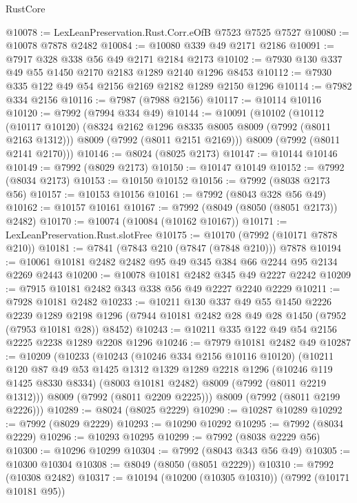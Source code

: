 \begin{lexlean}{RustCore}
\begin{coremodule}
@10078 := LexLeanPreservation.Rust.Corr.eOfB @7523 @7525 @7527
@10080 := @10078 @7878 @2482
@10084 := @10080 @339 @49 @2171 @2186
@10091 := @7917 @328 @338 @56 @49 @2171 @2184 @2173
@10102 := @7930 @130 @337 @49 @55 @1450 @2170 @2183 @1289 @2140 @1296 @8453
@10112 := @7930 @335 @122 @49 @54 @2156 @2169 @2182 @1289 @2150 @1296
@10114 := @7982 @334 @2156
@10116 := @7987 (@7988 @2156)
@10117 := @10114 @10116
@10120 := @7992 (@7994 @334 @49)
@10144 := @10091
    (@10102
      (@10112
        (@10117 @10120)
        (@8324 @2162 @1296 @8335 @8005 @8009 (@7992 (@8011 @2163 @1312)))
        @8009
        (@7992 (@8011 @2151 @2169)))
      @8009
      (@7992 (@8011 @2141 @2170)))
@10146 := @8024 (@8025 @2173)
@10147 := @10144 @10146
@10149 := @7992 (@8029 @2173)
@10150 := @10147 @10149
@10152 := @7992 (@8034 @2173)
@10153 := @10150 @10152
@10156 := @7992 (@8038 @2173 @56)
@10157 := @10153 @10156
@10161 := @7992 (@8043 @328 @56 @49)
@10162 := @10157 @10161
@10167 := @7992 (@8049 (@8050 (@8051 @2173)) @2482)
@10170 := @10074 (@10084 (@10162 @10167))
@10171 := LexLeanPreservation.Rust.slotFree
@10175 := @10170 (@7992 (@10171 @7878 @210))
@10181 := @7841 (@7843 @210 (@7847 (@7848 @210))) @7878
@10194 := @10061 @10181 @2482 @2482 @95 @49 @345 @384 @66 @2244 @95 @2134 @2269 @2443
@10200 := @10078 @10181 @2482 @345 @49 @2227 @2242
@10209 := @7915 @10181 @2482 @343 @338 @56 @49 @2227 @2240 @2229
@10211 := @7928 @10181 @2482
@10233 := @10211
    @130
    @337
    @49
    @55
    @1450
    @2226
    @2239
    @1289
    @2198
    @1296
    (@7944 @10181 @2482 @28 @49 @28 @1450 (@7952 (@7953 @10181 @28)) @8452)
@10243 := @10211 @335 @122 @49 @54 @2156 @2225 @2238 @1289 @2208 @1296
@10246 := @7979 @10181 @2482 @49
@10287 := @10209
    (@10233
      (@10243
        (@10246 @334 @2156 @10116 @10120)
        (@10211
          @120
          @87
          @49
          @53
          @1425
          @1312
          @1329
          @1289
          @2218
          @1296
          (@10246 @119 @1425 @8330 @8334)
          (@8003 @10181 @2482)
          @8009
          (@7992 (@8011 @2219 @1312)))
        @8009
        (@7992 (@8011 @2209 @2225)))
      @8009
      (@7992 (@8011 @2199 @2226)))
@10289 := @8024 (@8025 @2229)
@10290 := @10287 @10289
@10292 := @7992 (@8029 @2229)
@10293 := @10290 @10292
@10295 := @7992 (@8034 @2229)
@10296 := @10293 @10295
@10299 := @7992 (@8038 @2229 @56)
@10300 := @10296 @10299
@10304 := @7992 (@8043 @343 @56 @49)
@10305 := @10300 @10304
@10308 := @8049 (@8050 (@8051 @2229))
@10310 := @7992 (@10308 @2482)
@10317 := @10194 (@10200 (@10305 @10310)) (@7992 (@10171 @10181 @95))

\end{coremodule}
\end{lexlean}
